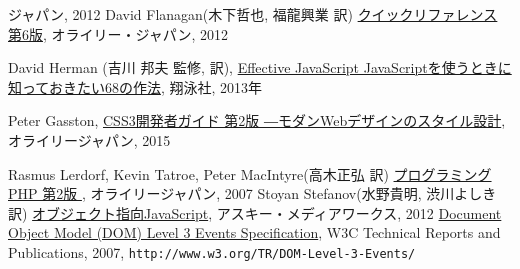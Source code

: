 \begin{thebibliography}{99}
	 ジャパン, 2012
 David Flanagan(木下哲也, 福龍興業 訳) 
            \href{http://www.amazon.co.jp/JavaScriptリファレンス-第6版-David-Flanagan/dp/4873115531/ref=sr_1_11?ie=UTF8&qid=1353802698&sr=8-11}
{\JS{} クイックリファレンス 第6版}, オライリー・ジャパン, 2012
\iffalse
 \bibitem{geroimenko}
Vladimir Geroimenko, Chaomei Chen(Ed.),\\
\href{http://www.amazon.co.jp/exec/obidos/ASIN/1852337907/qid=1146667282/sr=1-1/ref=sr_1_10_1/249-3353534-4529100}
   {\it Visualizing
	Information Using SVG and X3D: XML-based Technologies For The
	XML-based Web}, Springer Verlag 2005
\fi
{}David Herman (吉川 邦夫 監修, 訳),
\href{http://www.amazon.co.jp/Effective-JavaScript-JavaScript%E3%82%92%E4%BD%BF%E3%81%86%E3%81%A8%E3%81%8D%E3%81%AB%E7%9F%A5%E3%81%A3%E3%81%A6%E3%81%8A%E3%81%8D%E3%81%9F%E3%81%8468%E3%81%AE%E5%86%B4%E3%81%88%E3%81%9F%E3%82%84%E3%82%8A%E6%96%B9-David-Herman/dp/4798131113/ref=sr_1_1?ie=UTF8&qid=1365329955&sr=8-1&keywords=JavaScript%E3%82%92%E4%BD%BF%E3%81%86%E3%81%A8%E3%81%8D%E3%81%AB%E7%9F%A5%E3%81%A3%E3%81%A6%E3%81%8A%E3%81%8D%E3%81%9F%E3%81%84%EF%BC%96%EF%BC%98}
{Effective JavaScript JavaScriptを使うときに知っておきたい68の作法}, 
翔泳社, 2013年

 Peter Gasston,
				 \href{https://www.amazon.co.jp/s/ref=nb_sb_ss_i_5_4/351-1343008-2819052?__mk_ja_JP=%E3%82%AB%E3%82%BF%E3%82%AB%E3%83%8A&url=search-alias%3Daps&field-keywords=css3%E9%96%8B%E7%99%BA%E8%80%85%E3%82%AC%E3%82%A4%E3%83%89&sprefix=css3%2Caps%2C226&crid=2KO0TT8P0FOGT}{CSS3開発者ガイド 第2版 ―モダンWebデザインのスタイル設計},
				 オライリージャパン, 2015

Rasmus Lerdorf, Kevin Tatroe, Peter MacIntyre(高木正弘 訳)
\href{http://www.amazon.co.jp/プログラミングPHP-第2版-Rasmus-Lerdorf/dp/4873113423/ref=sr_1_6?ie=UTF8&s=gateway&qid=1202533375&sr=8-6}
{プログラミングPHP 第2版 },  オライリージャパン, 2007
Stoyan Stefanov(水野貴明, 渋川よしき 訳)
\href{http://www.amazon.co.jp/オブジェクト指向
	JavaScript-Stoyan-Stefanov/dp/4048706705/ref=sr_1_1?ie=UTF8&qid=1353803180&sr=8-1}
{オブジェクト指向JavaScript}, アスキー・メディアワークス, 2012
\href{http://www.w3.org/TR/2007/DOM-Level-3-Events-20071221/}
{Document Object Model (DOM) Level 3 Events Specification},
    W3C Technical Reports and Publications, 2007,
\texttt{http://www.w3.org/TR/DOM-Level-3-Events/}


\end{thebibliography}
